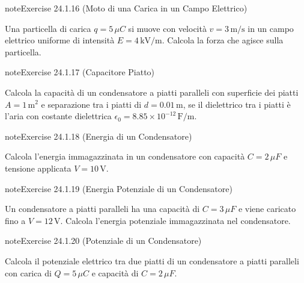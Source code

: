 \documentclass[letterpaper,10pt,italian]{jupyterBook}
\begin{document}
\begin{sphinxadmonition}{note}{Exercise 24.1.16 (Moto di una Carica in un Campo Elettrico)}



\sphinxAtStartPar
Una particella di carica \(q = 5 \, \mu C\) si muove con velocità \(v = 3 \, \text{m/s}\) in un campo elettrico uniforme di intensità \(E = 4 \, \text{kV/m}\). Calcola la forza che agisce sulla particella.
\end{sphinxadmonition}
 \label{exercise:ch/electromagnetism/electrostatics-problems-exercise-16}

\begin{sphinxadmonition}{note}{Exercise 24.1.17 (Capacitore Piatto)}



\sphinxAtStartPar
Calcola la capacità di un condensatore a piatti paralleli con superficie dei piatti \(A = 1 \, \text{m}^2\) e separazione tra i piatti di \(d = 0.01 \, \text{m}\), se il dielettrico tra i piatti è l’aria con costante dielettrica \(\epsilon_0 = 8.85 \times 10^{-12} \, \text{F/m}\).
\end{sphinxadmonition}
 \label{exercise:ch/electromagnetism/electrostatics-problems-exercise-17}

\begin{sphinxadmonition}{note}{Exercise 24.1.18 (Energia di un Condensatore)}



\sphinxAtStartPar
Calcola l’energia immagazzinata in un condensatore con capacità \(C = 2 \, \mu F\) e tensione applicata \(V = 10 \, \text{V}\).
\end{sphinxadmonition}
 \label{exercise:ch/electromagnetism/electrostatics-problems-exercise-18}

\begin{sphinxadmonition}{note}{Exercise 24.1.19 (Energia Potenziale di un Condensatore)}



\sphinxAtStartPar
Un condensatore a piatti paralleli ha una capacità di \(C = 3 \, \mu F\) e viene caricato fino a \(V = 12 \, \text{V}\). Calcola l’energia potenziale immagazzinata nel condensatore.
\end{sphinxadmonition}
 \label{exercise:ch/electromagnetism/electrostatics-problems-exercise-19}

\begin{sphinxadmonition}{note}{Exercise 24.1.20 (Potenziale di un Condensatore)}



\sphinxAtStartPar
Calcola il potenziale elettrico tra due piatti di un condensatore a piatti paralleli con carica di \(Q = 5 \, \mu C\) e capacità di \(C = 2 \, \mu F\).
\end{sphinxadmonition}
 \label{exercise:ch/electromagnetism/electrostatics-problems-exercise-20}
\end{document}
